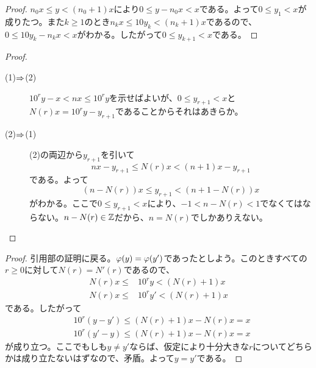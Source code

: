 \begin{proof}
  $n_0 x \leq y < (n_0 + 1)x$により$0 \leq y - n_0 x < x$である。よって$0 \leq y_1 < x$が成りたつ。また$k \geq 1$のとき$n_k x \leq 10y_k < (n_k + 1)x$であるので、$0 \leq 10y_k - n_kx  < x$がわかる。したがって$0 \leq y_{k+1} < x$である。
\end{proof}

\begin{proof}
  ${}$
  \begin{description}
    \item[(1)$\Rightarrow$(2)] $10^r y - x < nx \leq 10^r y$を示せばよいが、$0 \leq y_{r+1} < x$と$N(r)x = 10^r y - y_{r+1}$であることからそれはあきらか。
    \item[(2)$\Rightarrow$(1)] (2)の両辺から$y_{r+1}$を引いて
    \[
    nx - y_{r+1} \leq N(r)x < (n+1)x - y_{r+1}
    \]
    である。よって
    \[
    (n - N(r))x \leq y_{r+1} < (n+1 - N(r))x
    \]
    がわかる。ここで$0 \leq y_{r+1} < x$により、$-1 < n - N(r) < 1$でなくてはならない。$n - N(r) \in {\mathbb Z}$だから、$n=N(r)$でしかありえない。
  \end{description}
\end{proof}

\begin{proof}
引用部の証明に戻る。${\varphi}(y) = {\varphi}(y')$であったとしよう。このときすべての$r \geq 0$に対して$N(r) = N'(r)$であるので、
\begin{align*}
  N(r)x \leq &10^r y < (N(r)+1)x \\
  N(r)x \leq &10^r y' < (N(r)+1)x
\end{align*}
である。したがって
\begin{align*}
  &10^r(y - y') \leq (N(r)+1)x - N(r)x = x \\
  &10^r(y' - y) \leq (N(r)+1)x - N(r)x = x
\end{align*}
が成り立つ。ここでもしも$y \neq y'$ならば、仮定により十分大きな$r$についてどちらかは成り立たないはずなので、矛盾。よって$y = y'$である。
\end{proof}


